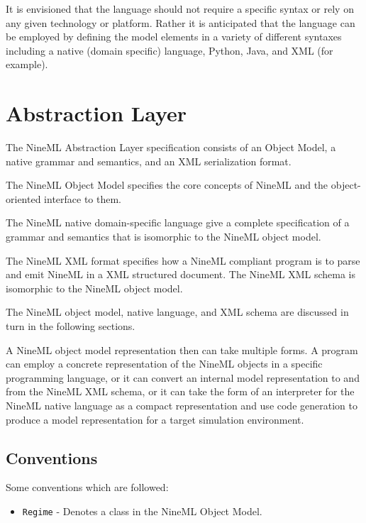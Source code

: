 \documentclass[a4paper]{article}
\newcommand\nmlClass[1]{{\tt #1}}
\begin{document}
It is envisioned that the language should not require a
specific syntax or rely on any given technology or platform.
Rather it is anticipated that the language can be
employed by defining the model elements in a variety of different
syntaxes including a native (domain specific) language, Python, Java,
and XML (for example).


\section{Abstraction Layer}

The NineML Abstraction Layer specification consists of an Object
Model, a native grammar and semantics, and an XML serialization
format.


The NineML Object Model specifies the core concepts of NineML and the
object-oriented interface to them.

The NineML native domain-specific language give a complete specification
of a grammar and semantics that is isomorphic to the NineML object
model.

The NineML XML format specifies how a NineML compliant program is to
parse and emit NineML in a XML structured document.  The NineML XML
schema is isomorphic to the NineML object model.

The NineML object model, native language, and XML schema are discussed
in turn in the following sections.

A NineML object model representation then can take multiple forms.  A
program can employ a concrete representation of the NineML objects in
a specific programming language, or it can convert an internal model
representation to and from the NineML XML schema, or it can take the
form of an interpreter for the NineML native language as a compact
representation and use code generation to produce a model
representation for a target simulation environment.

\subsection{Conventions}

Some conventions which are followed:

\begin{itemize}
\item \nmlClass{Regime} - Denotes a class in the NineML Object Model.

\end{itemize}
\end{document}
